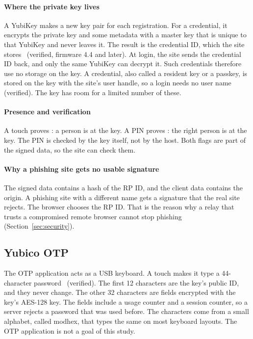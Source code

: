 \paragraph{Where the private key lives} A YubiKey makes a new key pair for
each registration. For a  credential, it encrypts the
private key and some metadata with a master key that is unique to that
YubiKey and never leaves it. The result is the credential ID, which the site
stores~\cite{yk-keygen} (verified, firmware 4.4 and later). At login, the
site sends the credential ID back, and only the same YubiKey can decrypt it.
Such credentials therefore use no storage on the key. A
 credential, also called a resident key or a passkey, is
stored on the key with the site's user handle, so a login needs no user
name~\cite{yk-resident} (verified). The key has room for a limited number of
these.

\paragraph{Presence and verification} A touch proves : a
person is at the key. A PIN proves : the right person
is at the key. The PIN is checked by the key itself, not by the host. Both
flags are part of the signed data, so the site can check them.

\paragraph{Why a phishing site gets no usable signature} The signed
data contains a hash of the RP ID, and the client data contains the origin.
A phishing site with a different name gets a signature that the real site
rejects. The browser chooses the RP ID. That is the reason why a relay that
trusts a compromised remote browser cannot stop phishing
(Section~\ref{sec:security}).

\subsection{Yubico OTP}

The OTP application acts as a USB keyboard. A touch makes it type a
44-character password~\cite{yk-otp} (verified). The first 12 characters are
the key's public ID, and they never change. The other 32 characters are
fields encrypted with the key's AES-128 key. The fields include a usage
counter and a session counter, so a server rejects a password that was used
before. The characters come from a small alphabet, called modhex, that types
the same on most keyboard layouts. The OTP application is not a goal of
this study.

